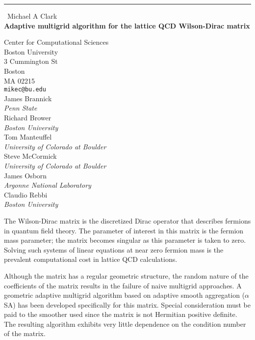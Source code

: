 \documentclass{report}
\begin{document}
\begin{center}
\rule{6in}{1pt} \
{\large Michael A Clark \\
{\bf Adaptive multigrid algorithm for the lattice QCD Wilson-Dirac matrix }}

Center for Computational Sciences \\ Boston University \\ 3 Cummington St \\ Boston \\ MA 02215
\\
{\tt mikec@bu.edu}\\
James Brannick\\
{\em Penn State}\\
Richard Brower\\
{\em Boston University}\\
Tom Manteuffel \\
{\em University of Colorado at Boulder}\\
Steve McCormick\\
{\em University of Colorado at Boulder}\\
James Osborn\\
{\em Argonne National Laboratory}\\
Claudio Rebbi\\
{\em Boston University}\end{center}

The Wilson-Dirac matrix is the discretized Dirac operator that describes
fermions in quantum field theory. The parameter of interest in this
matrix is the fermion mass parameter; the matrix becomes singular as this
parameter is taken to zero. Solving such systems of linear equations at
near zero fermion mass is the prevalent computational cost in lattice QCD
calculations.

Although the matrix has a regular geometric structure, the random nature
of the coefficients of the matrix results in the failure of naive
multigrid approaches. A geometric adaptive multigrid algorithm based on
adaptive smooth aggregation (\(\alpha\)SA) has been developed
specifically for this matrix. Special consideration must be paid to the
smoother used since the matrix is not Hermitian positive definite. The
resulting algorithm exhibits very little dependence on the condition
number of the matrix.
\end{document}
